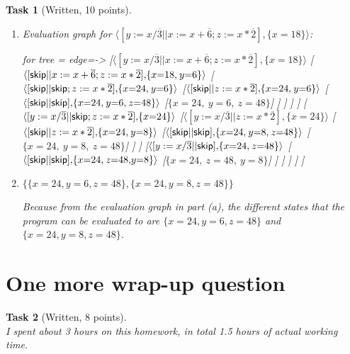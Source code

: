 \documentclass{article}
\newcommand{\stmt}[1]{\text{\sffamily #1}}
\newcommand{\assign}[2]{#1 := #2}
\newcommand{\const}[1]{\overline{#1}}
\newcommand{\wrapup}[2]{I spent about #1 hours on this homework, in total #2 hours of actual working time.}
\theoremstyle{task}
\newtheorem{task}{Task}[section]
\begin{document}
\begin{task}[Written, 10 points]\
    \begin{enumerate}
        \item Evaluation graph for $\langle[\assign{y}{x/\const{3}} || \assign{x}{x + \const{6}}; \assign{z}{x * \const{2}}], \{x = 18\}\rangle$:

            \begin{center}
                \begin{forest}
                    for tree = {edge={->}}
                    [$\langle {[\assign{y}{x/\const{3}} || \assign{x}{x + \const{6}}; \assign{z}{x * \const{2}}]}{,} \{x {=} 18\} \rangle$
                        [$\langle {[\stmt{skip} || \assign{x}{x + \const{6}}; \assign{z}{x * \const{2}}]}{,} \{x {=} 18{,}\: y {=} 6\} \rangle$
                            [$\langle {[\stmt{skip} || \stmt{skip}; \assign{z}{x * \const{2}}]}{,} \{x {=} 24{,}\: y {=} 6\} \rangle$
                                [$\langle {[\stmt{skip} || \assign{z}{x * \const{2}}]}{,} \{x {=} 24{,}\: y {=} 6\} \rangle$
                                    [$\langle {[\stmt{skip} || \stmt{skip}]}{,} \{x {=} 24{,}\: y {=} 6{,}\: z {=} 48\} \rangle$
                                        [$\{x {=} 24{,}\: y {=} 6{,}\: z {=} 48\}$]
                                    ]
                                ]
                            ]
                        ]
                        [$\langle {[\assign{y}{x/\const{3}} || \stmt{skip}; \assign{z}{x * \const{2}}]}{,} \{x {=} 24\} \rangle$
                            [$\langle {[\assign{y}{x/\const{3}} || \assign{z}{x * \const{2}}]}{,} \{x {=} 24\} \rangle$
                                [$\langle {[\stmt{skip} || \assign{z}{x * \const{2}}]}{,} \{x {=} 24{,}\: y {=} 8\} \rangle$
                                    [$\langle {[\stmt{skip} || \stmt{skip}]}{,} \{x {=} 24{,}\: y {=} 8{,}\: z {=} 48\} \rangle$
                                        [$\{x {=} 24{,}\: y {=} 8{,}\: z {=} 48\}$]
                                    ]
                                ]
                                [$\langle {[\assign{y}{x/\const{3}} || \stmt{skip}]}{,} \{x {=} 24{,}\: z {=} 48\} \rangle$
                                    [$\langle {[\stmt{skip} || \stmt{skip}]}{,} \{x {=} 24{,}\: z {=} 48{,} y {=} 8\} \rangle$
                                        [$\{x {=} 24{,}\: z {=} 48{,}\: y {=} 8\}$]
                                    ]
                                ]
                            ]
                        ]
                    ]
                \end{forest}
            \end{center}
        \item $\{\{x = 24, y = 6, z = 48\}, \{x = 24, y = 8, z = 48\}\}$

            Because from the evaluation graph in part (a), the different states
            that the program can be evaluated to are $\{x = 24, y = 6, z = 48\}$
            and $\{x = 24, y = 8, z = 48\}$.
    \end{enumerate}
\end{task}

\section{One more wrap-up question}

\begin{task}[Written, 8 points]\ \\
    \wrapup{3}{1.5}
\end{task}
\end{document}
